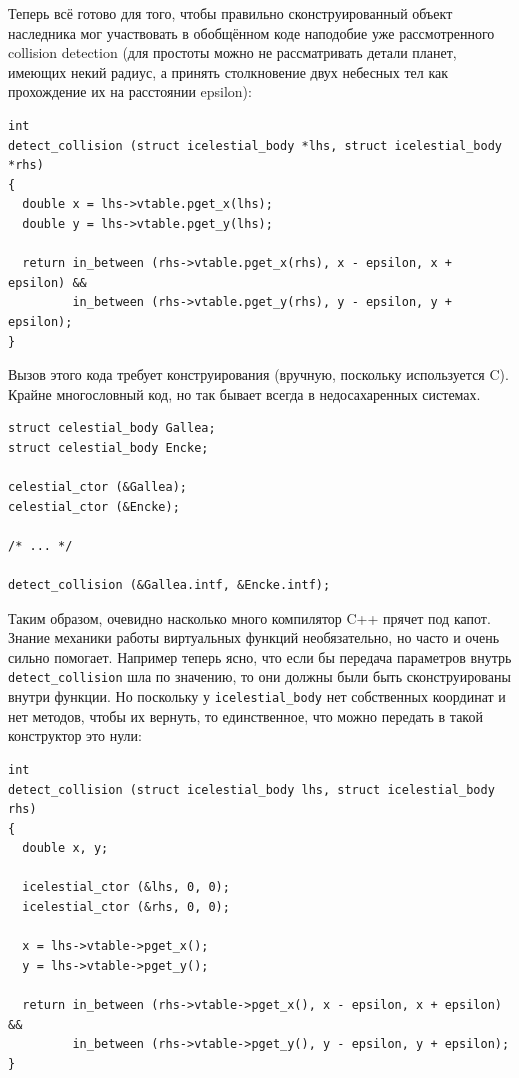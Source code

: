 \documentclass[a4paper,12pt,oneside]{book}
\begin{document}
Теперь всё готово для того, чтобы правильно сконструированный объект наследника мог участвовать в обобщённом коде наподобие уже рассмотренного collision detection (для простоты можно не рассматривать детали планет, имеющих некий радиус, а принять столкновение двух небесных тел как прохождение их на расстоянии epsilon):

\begin{lstlisting}
int
detect_collision (struct icelestial_body *lhs, struct icelestial_body *rhs)
{
  double x = lhs->vtable.pget_x(lhs);
  double y = lhs->vtable.pget_y(lhs);
 
  return in_between (rhs->vtable.pget_x(rhs), x - epsilon, x + epsilon) && 
         in_between (rhs->vtable.pget_y(rhs), y - epsilon, y + epsilon);
}
\end{lstlisting}

Вызов этого кода требует конструирования (вручную, поскольку используется C). Крайне многословный код, но так бывает всегда в недосахаренных системах.

\begin{lstlisting}
struct celestial_body Gallea;
struct celestial_body Encke;

celestial_ctor (&Gallea);
celestial_ctor (&Encke);

/* ... */

detect_collision (&Gallea.intf, &Encke.intf);
\end{lstlisting}

Таким образом, очевидно насколько много компилятор C++ прячет под капот. Знание механики работы виртуальных функций необязательно, но часто и очень сильно помогает. Например теперь ясно, что если бы передача параметров внутрь \lstinline!detect_collision! шла по значению, то они должны были быть сконструированы внутри функции. Но поскольку у \lstinline!icelestial_body! нет собственных координат и нет методов, чтобы их вернуть, то единственное, что можно передать в такой конструктор это нули:

\begin{lstlisting}
int
detect_collision (struct icelestial_body lhs, struct icelestial_body rhs)
{
  double x, y;
  
  icelestial_ctor (&lhs, 0, 0);
  icelestial_ctor (&rhs, 0, 0);

  x = lhs->vtable->pget_x();
  y = lhs->vtable->pget_y();
 
  return in_between (rhs->vtable->pget_x(), x - epsilon, x + epsilon) && 
         in_between (rhs->vtable->pget_y(), y - epsilon, y + epsilon);
}
\end{lstlisting}
\end{document}
